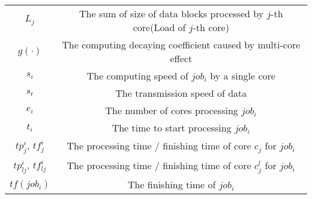 \documentclass{article}
\begin{document}
\begin{appendices}
\begin{table}[htbp]
\begin{center}
\begin{tabular}{c|c}
$L_j$& The sum of size of data blocks processed by $j$-th core(Load of $j$-th core) \\
$g(\cdot)$ &  The computing decaying coefficient caused by multi-core effect\\
$s_i$ & The computing speed of $job_i$ by a single core\\
$s_t$ & The transmission speed of data \\
$e_i$ & The number of cores processing $job_i$\\ 
$t_i$ & The time to start processing $job_i$\\
$tp^i_j$, $tf^i_{j}$ & The processing time / finishing time of core $c_j$ for $job_i$\\
$tp^i_{lj}$, $tf^i_{lj}$ & The processing time / finishing time of core $c^l_j$ for $job_i$\\
$tf(job_i)$ & The finishing time of $job_i$ \\
 
\bottomrule
\end{tabular}
\label{tabSYMBOLS}
\end{center}
\end{table}

\end{appendices}





\end{document}
